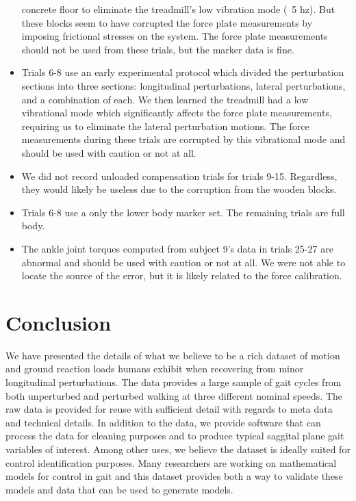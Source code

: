 \documentclass[fleqn,10pt]{wlpeerj}
\begin{document}
\begin{itemize}
    concrete floor to eliminate the treadmill's low vibration mode
    (~5 hz). But these blocks seem to have corrupted the force plate
    measurements by imposing frictional stresses on the system. The force plate
    measurements should not be used from these trials, but the marker data is
    fine.
  \item Trials 6-8 use an early experimental protocol which divided the
    perturbation sections into three sections: longitudinal perturbations,
    lateral perturbations, and a combination of each. We then learned the
    treadmill had a low vibrational mode which significantly affects the force
    plate measurements, requiring us to eliminate the lateral perturbation
    motions. The force measurements during these trials are corrupted by this
    vibrational mode and should be used with caution or not at all.
  \item We did not record unloaded compensation trials for trials 9-15.
    Regardless, they would likely be useless due to the corruption from the
    wooden blocks.
  \item Trials 6-8 use a only the lower body marker set. The remaining trials
    are full body.
  \item The ankle joint torques computed from subject 9's data in trials 25-27
    are abnormal and should be used with caution or not at all. We were not
    able to locate the source of the error, but it is likely related to the
    force calibration.
\end{itemize}

\section*{Conclusion}

We have presented the details of what we believe to be a rich dataset of motion
and ground reaction loads humans exhibit when recovering from minor
longitudinal perturbations. The data provides a large sample of gait cycles
from both unperturbed and perturbed walking at three different nominal speeds.
The raw data is provided for reuse with sufficient detail with regards to meta
data and technical details. In addition to the data, we provide software that
can process the data for cleaning purposes and to produce typical saggital
plane gait variables of interest. Among other uses, we believe the dataset is
ideally suited for control identification purposes. Many researchers are
working on mathematical models for control in gait and this dataset provides
both a way to validate these models and data that can be used to generate
models.
\end{document}
